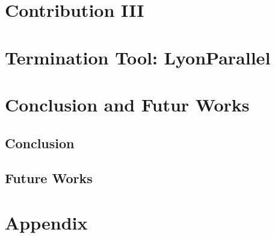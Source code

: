 \documentclass{book}
\begin{document}
\part{Contribution III}
% 
%     
%     
%     
%     

\part{Termination Tool: LyonParallel}


\part{Conclusion and Futur Works}
\chapter{Conclusion}

\chapter{Future Works}

\part{Appendix}

\printbibliography
\end{document}

